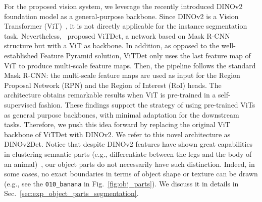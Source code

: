  For the proposed vision system, we leverage the recently introduced DINOv2~\cite{oquab2023} foundation model as a general-purpose backbone. Since DINOv2 is a Vision Transformer (ViT)~\cite{dosovitskiy2020}, it is not directly applicable for the instance segmentation task. Nevertheless,~\cite{li2022} proposed ViTDet, a network based on Mask R-CNN~\cite{he2017} structure but with a ViT as backbone. In addition, as opposed to the well-established Feature Pyramid solution, ViTDet only uses the last feature map of ViT to produce multi-scale feature maps. Then, the pipeline follows the standard Mask R-CNN: the multi-scale feature maps are used as input for the Region Proposal Network (RPN) and the Region of Interest (RoI) heads. The architecture obtains remarkable results when ViT is pre-trained in a self-supervised fashion. 
These findings support the strategy of using pre-trained ViTs as general purpose backbones, with minimal adaptation for the downstream tasks. Therefore, we push this idea forward by replacing the original ViT backbone of ViTDet with DINOv2. 
We refer to this novel architecture as DINOv2Det.
Notice that despite DINOv2 features have shown great capabilities in clustering semantic parts (e.g., differentiate between the legs and the body of an animal)~\cite{oquab2023}, our object parts do not necessarily have such distinction. 
Indeed, in some cases, no exact boundaries in terms of object shape or texture can be drawn (e.g., see the \texttt{010\_banana} in Fig.~\ref{fig:obj_parts}). We discuss it in details in Sec.~\ref{sec:exp_object_parts_segmentation}. 



